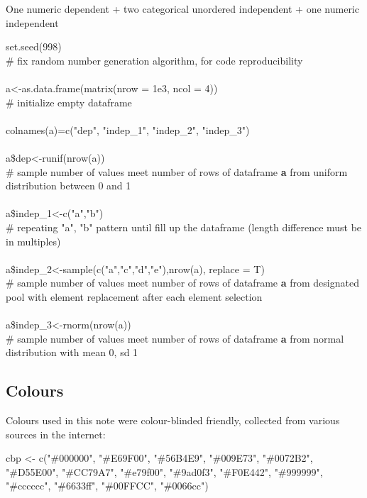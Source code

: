\documentclass[../note.tex]{subfiles} %
\begin{document}
One numeric dependent + two categorical unordered independent + one numeric independent
\begin{code}
set.seed(998)\\\# fix random number generation algorithm, for code reproducibility\\\\

a<-as.data.frame(matrix(nrow = 1e3, ncol = 4))\\\# initialize empty dataframe\\\\

colnames(a)=c("dep", "indep\_1", "indep\_2", "indep\_3")\\\\

a\$dep<-runif(nrow(a))\\\# sample number of values meet number of rows of dataframe \textbf{a} from uniform distribution between 0 and 1\\\\

a\$indep\_1<-c("a","b")\\\# repeating "a", "b" pattern until fill up the dataframe (length difference must be in multiples)\\\\

a\$indep\_2<-sample(c("a","c","d","e"),nrow(a), replace = T)\\\# sample number of values meet number of rows of dataframe \textbf{a} from designated pool with element replacement after each element selection\\\\

a\$indep\_3<-rnorm(nrow(a))\\\# sample number of values meet number of rows of dataframe \textbf{a} from normal distribution with mean 0, sd 1
\end{code}

\subsection{Colours}
Colours used in this note were colour-blinded friendly, collected from various sources in the internet:
\begin{code}
cbp <- c("\#000000", "\#E69F00", "\#56B4E9", "\#009E73", "\#0072B2", "\#D55E00", "\#CC79A7", "\#e79f00", "\#9ad0f3", "\#F0E442", "\#999999", "\#cccccc", "\#6633ff", "\#00FFCC", "\#0066cc")
\end{code}
\end{document}
